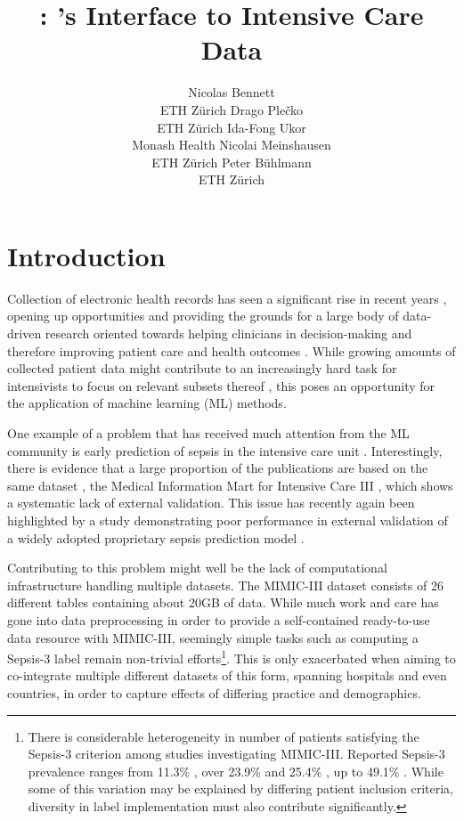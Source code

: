 \documentclass[
  notitle,
  nojss,
  noheadings]{jss}
\author{
Nicolas Bennett\footnotemark[1]\\ETH Zürich \And Drago
Plečko\footnotemark[1]\footnotetext[1]{These authors contributed equally.}\\ETH Zürich \And Ida-Fong Ukor\\Monash Health \AND Nicolai Meinshausen\\ETH Zürich \And Peter Bühlmann\\ETH Zürich
}
\title{\pkg{ricu}: \proglang{R}'s Interface to Intensive Care Data}
\begin{document}
\maketitle

\renewcommand*{\thefootnote}{\fnsymbol{footnote}}
\renewcommand*{\thefootnote}{\arabic{footnote}}

\hypertarget{introduction}{%
\section{Introduction}\label{introduction}}

Collection of electronic health records has seen a significant rise in
recent years \citep{evans2016}, opening up opportunities and providing
the grounds for a large body of data-driven research oriented towards
helping clinicians in decision-making and therefore improving patient
care and health outcomes \citep{jiang2017}. While growing amounts of
collected patient data might contribute to an increasingly hard task for
intensivists to focus on relevant subsets thereof \citep{pickering2013},
this poses an opportunity for the application of machine learning (ML)
methods.

One example of a problem that has received much attention from the ML
community is early prediction of sepsis in the intensive care unit
\citep[ICU;][]{desautels2016, nemati2018, futoma2017, kam2017}.
Interestingly, there is evidence that a large proportion of the
publications are based on the same dataset \citep{fleuren2019}, the
Medical Information Mart for Intensive Care III
\citep[MIMIC-III;][]{johnson2016}, which shows a systematic lack of
external validation. This issue has recently again been highlighted by a
study demonstrating poor performance in external validation of a widely
adopted proprietary sepsis prediction model \citep{wong2021}.

Contributing to this problem might well be the lack of computational
infrastructure handling multiple datasets. The MIMIC-III dataset
consists of 26 different tables containing about 20GB of data. While
much work and care has gone into data preprocessing in order to provide
a self-contained ready-to-use data resource with MIMIC-III, seemingly
simple tasks such as computing a Sepsis-3 label \citep{singer2016}
remain non-trivial efforts\footnote{There is considerable heterogeneity
  in number of patients satisfying the Sepsis-3 criterion
  \citep{singer2016} among studies investigating MIMIC-III. Reported
  Sepsis-3 prevalence ranges from 11.3\% \citep{desautels2016}, over
  23.9\% \citep{nemati2018} and 25.4\% \citep{wang2018}, up to 49.1\%
  \citep{johnson2018}. While some of this variation may be explained by
  differing patient inclusion criteria, diversity in label
  implementation must also contribute significantly.}. This is only
exacerbated when aiming to co-integrate multiple different datasets of
this form, spanning hospitals and even countries, in order to capture
effects of differing practice and demographics.
\end{document}
